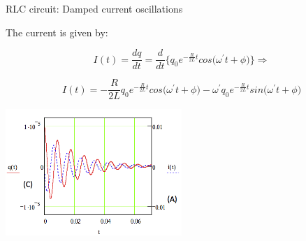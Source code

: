 \begin{frame}{RLC circuit: Damped current oscillations}



The current is given by:

\begin{equation*}
   I(t) = \frac{dq}{dt} = \frac{d}{dt}  \Big\{ q_0 e^{-\frac{R}{2L}t} cos\Big(\omega^{\prime} t + \phi \Big) \Big\} \Rightarrow
\end{equation*}

\begin{equation*}
   I(t) =  -\frac{R}{2L} q_0 e^{-\frac{R}{2L}t} cos\Big(\omega^{\prime} t + \phi \Big)
             -\omega^{\prime} q_0 e^{-\frac{R}{2L}t} sin\Big(\omega^{\prime} t + \phi \Big)
\end{equation*}

\begin{center}
     \includegraphics[width=0.50\textwidth]{./images/misc/ItRLC.png}\\
\end{center}

\end{frame}

%
%
%

